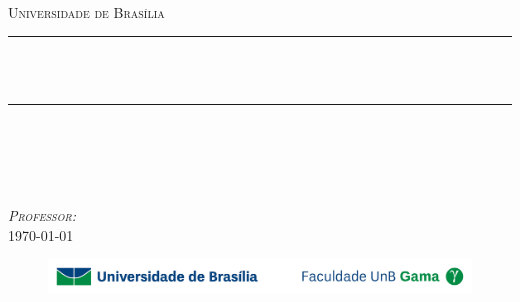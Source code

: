 \begin{titlepage}

\newcommand{\HRule}{\rule{\linewidth}{0.5mm}} %

\center %

\textsc{\LARGE \disciplina{}}\\[1.5cm] 
\textsc{\Large Universidade de Bras\' ilia}\\[0.5cm]

\vspace{3cm}


\HRule \\[0.4cm]
{ \huge \bfseries \thetitle }\\[0.4cm] %
\HRule \\[1.5cm]
 

\vspace{2cm}


\textsc{\LARGE \theauthor }\\[0.8cm]
\textsc{\LARGE \matricula{} }\\[1.5cm]

\vspace{0.5cm}

\textsc{\Large \textit{Professor: } \professor{}}\\[1cm]


{\large \today}\\[2cm] %

\begin{figure}[!b]
    \centering
    \includegraphics[width=\linewidth]{images/logofgaunb.jpg}
\end{figure}


\vfill %

\end{titlepage}
